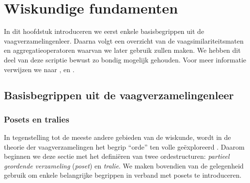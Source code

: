 \chapter{Wiskundige fundamenten}

In dit hoofdstuk introduceren we eerst enkele basisbegrippen uit de vaagverzamelingenleer. 
Daarna volgt een overzicht van de vaagsimilariteitsmaten en aggregatieoperatoren waarvan
we later gebruik zullen maken. We hebben dit deel van deze scriptie bewust zo 
bondig mogelijk gehouden. Voor meer informatie verwijzen
we naar \cite{kerre:vaagmodellen}, \cite{vanderweken:similariteitsmaten} en 
\cite{detyniecki:numerical_aggregation_operators}.


\section{Basisbegrippen uit de vaagverzamelingenleer}

\subsection{Posets en tralies}
\label{sectie:posets_en_tralies}

In tegenstelling tot de meeste andere gebieden van de wiskunde, wordt in de theorie der 
vaagverzamelingen het begrip ``orde'' ten volle ge\"exploreerd \cite{kerre:vaagmodellen}. Daarom beginnen we deze 
sectie met het defini\"eren van twee ordestructuren: \emph{partieel geordende verzameling} 
(\emph{poset}) en \emph{tralie}. We maken bovendien van de gelegenheid gebruik om enkele 
belangrijke begrippen in verband met posets te introduceren. 

